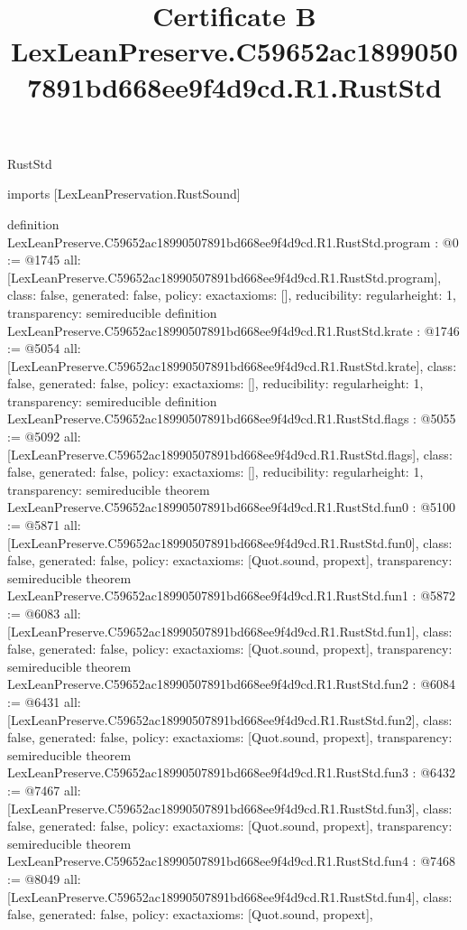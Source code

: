 \begin{lexlean}{RustStd}
\title{Certificate B LexLeanPreserve.C59652ac18990507891bd668ee9f4d9cd.R1.RustStd}
\begin{coremodule}
imports [LexLeanPreservation.RustSound]

definition LexLeanPreserve.C59652ac18990507891bd668ee9f4d9cd.R1.RustStd.program : @0 := @1745 {
  all: [LexLeanPreserve.C59652ac18990507891bd668ee9f4d9cd.R1.RustStd.program],
  class: false,
  generated: false,
  policy: exact{axioms: []},
  reducibility: regular{height: 1},
  transparency: semireducible
}
definition LexLeanPreserve.C59652ac18990507891bd668ee9f4d9cd.R1.RustStd.krate : @1746 := @5054 {
  all: [LexLeanPreserve.C59652ac18990507891bd668ee9f4d9cd.R1.RustStd.krate],
  class: false,
  generated: false,
  policy: exact{axioms: []},
  reducibility: regular{height: 1},
  transparency: semireducible
}
definition LexLeanPreserve.C59652ac18990507891bd668ee9f4d9cd.R1.RustStd.flags : @5055 := @5092 {
  all: [LexLeanPreserve.C59652ac18990507891bd668ee9f4d9cd.R1.RustStd.flags],
  class: false,
  generated: false,
  policy: exact{axioms: []},
  reducibility: regular{height: 1},
  transparency: semireducible
}
theorem LexLeanPreserve.C59652ac18990507891bd668ee9f4d9cd.R1.RustStd.fun0 : @5100 := @5871 {
  all: [LexLeanPreserve.C59652ac18990507891bd668ee9f4d9cd.R1.RustStd.fun0],
  class: false,
  generated: false,
  policy: exact{axioms: [Quot.sound, propext]},
  transparency: semireducible
}
theorem LexLeanPreserve.C59652ac18990507891bd668ee9f4d9cd.R1.RustStd.fun1 : @5872 := @6083 {
  all: [LexLeanPreserve.C59652ac18990507891bd668ee9f4d9cd.R1.RustStd.fun1],
  class: false,
  generated: false,
  policy: exact{axioms: [Quot.sound, propext]},
  transparency: semireducible
}
theorem LexLeanPreserve.C59652ac18990507891bd668ee9f4d9cd.R1.RustStd.fun2 : @6084 := @6431 {
  all: [LexLeanPreserve.C59652ac18990507891bd668ee9f4d9cd.R1.RustStd.fun2],
  class: false,
  generated: false,
  policy: exact{axioms: [Quot.sound, propext]},
  transparency: semireducible
}
theorem LexLeanPreserve.C59652ac18990507891bd668ee9f4d9cd.R1.RustStd.fun3 : @6432 := @7467 {
  all: [LexLeanPreserve.C59652ac18990507891bd668ee9f4d9cd.R1.RustStd.fun3],
  class: false,
  generated: false,
  policy: exact{axioms: [Quot.sound, propext]},
  transparency: semireducible
}
theorem LexLeanPreserve.C59652ac18990507891bd668ee9f4d9cd.R1.RustStd.fun4 : @7468 := @8049 {
  all: [LexLeanPreserve.C59652ac18990507891bd668ee9f4d9cd.R1.RustStd.fun4],
  class: false,
  generated: false,
  policy: exact{axioms: [Quot.sound, propext]},
}
\end{coremodule}
\end{lexlean}

